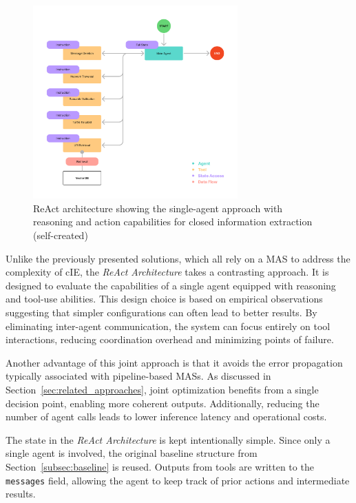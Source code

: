 \documentclass[a4paper,oneside,bibliography=totoc]{scrbook}
\begin{document}
\begin{figure}[tp]
  \centering
  \includegraphics[width=0.7\textwidth]{figures/ReAct Architecture.png}
  \caption[ReAct architecture showing the single-agent approach with reasoning and action capabilities for closed information extraction]{ReAct architecture showing the single-agent approach with reasoning and action capabilities for closed information extraction (self-created)}
  \label{fig:react_architecture}
\end{figure}

Unlike the previously presented solutions, which all rely on a \ac{MAS} to address the complexity of \ac{cIE}, the \textit{ReAct Architecture} takes a contrasting approach. It is designed to evaluate the capabilities of a single agent equipped with reasoning and tool-use abilities. This design choice is based on empirical observations suggesting that simpler configurations can often lead to better results. By eliminating inter-agent communication, the system can focus entirely on tool interactions, reducing coordination overhead and minimizing points of failure.

Another advantage of this joint approach is that it avoids the error propagation typically associated with pipeline-based \acp{MAS}. As discussed in Section~\ref{sec:related_approaches}, joint optimization benefits from a single decision point, enabling more coherent outputs. Additionally, reducing the number of agent calls leads to lower inference latency and operational costs.

The state in the \textit{ReAct Architecture} is kept intentionally simple. Since only a single agent is involved, the original baseline structure from Section~\ref{subsec:baseline} is reused. Outputs from tools are written to the \texttt{messages} field, allowing the agent to keep track of prior actions and intermediate results.
\end{document}
